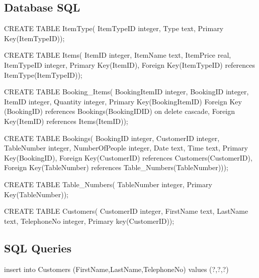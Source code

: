 \newpage
\subsection{Database SQL}

\begin{sql}
CREATE TABLE ItemType(
    ItemTypeID integer,
    Type text,
    Primary Key(ItemTypeID));
\end{sql}

\begin{sql}
CREATE TABLE Items(
             ItemID integer,
             ItemName text,
             ItemPrice real,
             ItemTypeID integer,
             Primary Key(ItemID),
             Foreign Key(ItemTypeID) references ItemType(ItemTypeID));
\end{sql}

\begin{sql}
CREATE TABLE Booking_Items(
    BookingItemID integer,
    BookingID integer,
    ItemID  integer,
    Quantity integer,
    Primary Key(BookingItemID)
    Foreign Key (BookingID) references Bookings(BookingIDID) on delete cascade,
    Foreign Key(ItemID) references Items(ItemID));
\end{sql}

\begin{sql}
CREATE TABLE Bookings(
	BookingID integer,
             CustomerID integer,
             TableNumber integer,
             NumberOfPeople integer,
             Date text,
             Time text,
             Primary Key(BookingID),
             Foreign Key(CustomerID) references Customers(CustomerID),
             Foreign Key(TableNumber) references Table_Numbers(TableNumber)));
\end{sql}

\begin{sql}
CREATE TABLE Table_Numbers(
    TableNumber integer,
    Primary Key(TableNumber));
\end{sql}

\begin{sql}
CREATE TABLE Customers(
             CustomerID integer,
             FirstName text,
             LastName text,
             TelephoneNo integer,
             Primary key(CustomerID));
\end{sql}

\subsection{SQL Queries}

\begin{sql}
insert into Customers (FirstName,LastName,TelephoneNo) values (?,?,?)
\end{sql}

